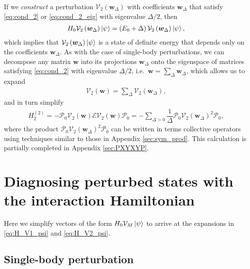 \documentclass[nofootinbib,notitlepage,11pt]{revtex4-2}
\newcommand{\f}[2]{\dfrac{#1}{#2}} %
\newcommand{\p}[1]{\left(#1\right)} %
\newcommand{\m}{\bm} %
\newcommand{\1}{\mathds{1}}
\newcommand{\E}{\mathcal{E}}
\renewcommand{\P}{\mathcal{P}}
\newcommand{\V}{\mathcal{V}}
\begin{document}
If we {\it construct} a perturbation $\V_2\p{\m w_\Delta}$ with
coefficients $\m w_\Delta$ that satisfy \eqref{eq:cond_2} or
\eqref{eq:cond_2_eig} with eigenvalue $\Delta/2$, then
\begin{align}
  H_0 \V_2\p{\m w_\Delta} \ket\psi
  = \p{E_0 + \Delta} \V_2\p{\m w_\Delta} \ket\psi,
\end{align}
which implies that $\V_2\p{\m w_\Delta}\ket\psi$ is a state of
definite energy that depends only on the coefficients $\m w_\Delta$.
As with the case of single-body perturbations, we can decompose any
matrix $\m w$ into its projections $\m w_\Delta$ onto the eigenspace
of matrices satisfying \eqref{eq:cond_2} with eigenvalue $\Delta/2$,
i.e.~$\m w=\sum_\Delta\m w_\Delta$, which allows us to expand
\begin{align}
  \V_2\p{\m w} = \sum_\Delta \V_2\p{\m w_\Delta},
\end{align}
and in turn simplify
\begin{align}
  H_2^{(2)} = - \P_0 \V_2\p{\m w} \E \V_2\p{\m w} \P_0
  = -\sum_{\Delta>0} \f1\Delta \P_0 \V_2\p{\m w_\Delta}^2 \P_0,
\end{align}
where the product $\P_0 \V_2\p{\m w_\Delta}^2 \P_0$ can be written in
terms collective operators using techniques similar to those in
Appendix \ref{sec:sym_prod}.  This calculation is partially completed
in Appendix \ref{sec:PXYXYP}.

\appendix

\section{Diagnosing perturbed states with the interaction Hamiltonian}

Here we simplify vectors of the form $H_0\V_M\ket\psi$ to arrive at
the expansions in \eqref{eq:H_V1_psi} and \eqref{eq:H_V2_psi}.

\subsection{Single-body perturbation}
\label{sec:H_V1_psi}
\end{document}
